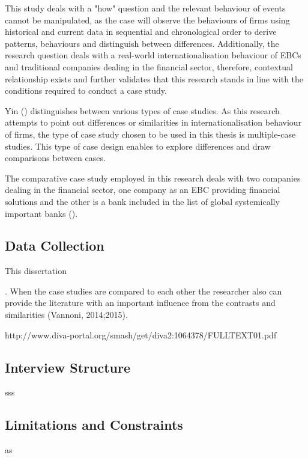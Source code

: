\documentclass[11pt,a4paper]{article}
\begin{document}
{This study deals with a "how" question and the relevant behaviour of events cannot be manipulated, as the case will observe the behaviours of firms using historical and current data in sequential and chronological order to derive patterns, behaviours and distinguish between differences. Additionally, the research question deals with a real-world internationalisation behaviour of EBCs and traditional companies dealing in the financial sector, therefore, contextual relationship exists and further validates that this research stands in line with the conditions required to conduct a case study. \par
Yin (\citeyear{yinCaseStudyResearch2017}) distinguishes between various types of case studies. As this research attempts to point out differences or similarities in internationalisation behaviour of firms, the type of case study chosen to be used in this thesis is multiple-case studies. This type of case design enables to explore differences and draw comparisons between cases. \par
The comparative case study employed in this research deals with two companies dealing in the financial sector, one company as an EBC providing financial solutions and the other is a bank included in the list of global systemically important banks (\cite{2019ListGlobal2019}). 





\subsection{Data Collection}
This dissertation 

. When the case studies are compared to each other the
researcher also can provide the literature with an important influence from
the contrasts and similarities (Vannoni, 2014;2015). 

http://www.diva-portal.org/smash/get/diva2:1064378/FULLTEXT01.pdf



\subsection{Interview Structure}
sss
\subsection{Limitations and Constraints}

as

}
\end{document}
